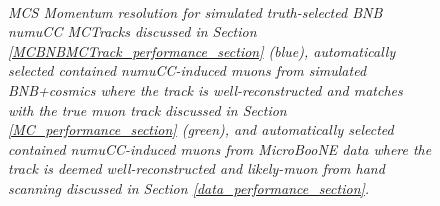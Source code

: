 \begin{figure}
\centering
\mbox{
	\quad
	}
\caption{\textit{MCS Momentum resolution for simulated truth-selected BNB numuCC {\sc MCTracks} discussed in Section \ref{MCBNBMCTrack_performance_section} (blue), automatically selected contained numuCC-induced muons from simulated BNB+cosmics where the track is well-reconstructed and matches with the true muon track discussed in Section \ref{MC_performance_section} (green), and automatically selected contained numuCC-induced muons from MicroBooNE data where the track is deemed well-reconstructed and likely-muon from hand scanning discussed in Section \ref{data_performance_section}.}}
\label{MCS_range_bias_resolution_masteroverlay_fig}
\end{figure}












